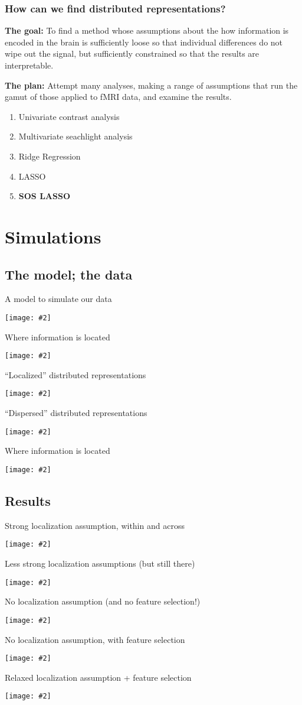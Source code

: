 \documentclass{beamer}
\newcommand {\framedgraphic}[2] {
    \begin{frame}{#1}
        \begin{center}
            \texttt{[image: \#2]}
        \end{center}
    \end{frame}
}
\begin{document}
\begin{frame}
\frametitle{How can we find distributed representations?}
{\bf The goal:} To find a method whose assumptions about the how information is encoded in the brain is sufficiently loose so that individual differences do not wipe out the signal, but sufficiently constrained so that the results are interpretable. 

{\bf The plan:} Attempt many analyses, making a range of assumptions that run the gamut of those applied to fMRI data, and examine the results.
\begin{enumerate}
\pause \item Univariate contrast analysis
\pause \item Multivariate seachlight analysis
\pause \item Ridge Regression
\pause \item LASSO
\pause \item {\bf SOS LASSO}
\end{enumerate}
\end{frame}

\section{Simulations}
\subsection{The model; the data}

\framedgraphic{A model to simulate our data}{../figures/model_outline.eps}
\framedgraphic{Where information is located}{../figures/between_within_dist.eps}
\framedgraphic{``Localized'' distributed representations}{data_demo_3.pdf}
\framedgraphic{``Dispersed'' distributed representations}{data_demo_4.pdf}

\framedgraphic{Where information is located}{../figures/between_within_dist.eps}

\subsection{Results}
\framedgraphic{Strong localization assumption, within and across}{../figures/univariate.eps}
\framedgraphic{Less strong localization assumptions (but still there)}{../figures/searchlight.eps}
\framedgraphic{No localization assumption (and no feature selection!)}{RidgeTritile_grey.pdf}
\framedgraphic{No localization assumption, with feature selection}{lasso_only.eps}
\framedgraphic{Relaxed localization assumption + feature selection}{soslasso_only.eps}
\end{document}
